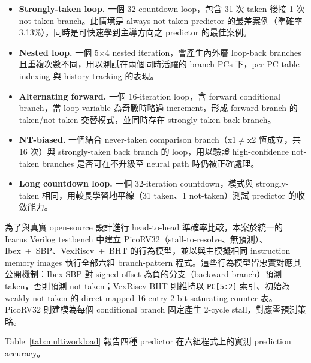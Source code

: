 \documentclass[12pt,a4paper]{article}
\begin{document}
	\begin{itemize}
		\item \textbf{Strongly-taken loop.} 一個 32-countdown loop，包含 31 次 taken 後接 1 次 not-taken branch。此情境是 always-not-taken predictor 的最差案例（準確率 3.13\%），同時是可快速學到主導方向之 predictor 的最佳案例。
		\item \textbf{Nested loop.} 一個 5$\times$4 nested iteration，會產生內外層 loop-back branches 且重複次數不同，用以測試在兩個同時活躍的 branch PCs 下，per-PC table indexing 與 history tracking 的表現。
		\item \textbf{Alternating forward.} 一個 16-iteration loop，含 forward conditional branch，當 loop variable 為奇數時略過 increment，形成 forward branch 的 taken/not-taken 交替模式，並同時存在 strongly-taken back branch。
		\item \textbf{NT-biased.} 一個結合 never-taken comparison branch（x1$\neq$x2 恆成立，共 16 次）與 strongly-taken back branch 的 loop，用以驗證 high-confidence not-taken branches 是否可在不升級至 neural path 時仍被正確處理。
		\item \textbf{Long countdown loop.} 一個 32-iteration countdown，模式與 strongly-taken 相同，用較長學習地平線（31 taken、1 not-taken）測試 predictor 的收斂能力。
	\end{itemize}

	為了與真實 open-source 設計進行 head-to-head 準確率比較，本案於統一的 Icarus Verilog testbench 中建立 PicoRV32（stall-to-resolve、無預測）、Ibex~+~SBP、VexRiscv~+~BHT 的行為模型，並以與主模擬相同 instruction memory images 執行全部六組 branch-pattern 程式。這些行為模型皆忠實對應其公開機制：Ibex SBP 對 signed offset 為負的分支（backward branch）預測 taken，否則預測 not-taken；VexRiscv BHT 則維持以 \texttt{PC[5:2]} 索引、初始為 weakly-not-taken 的 direct-mapped 16-entry 2-bit saturating counter 表。PicoRV32 則建模為每個 conditional branch 固定產生 2-cycle stall，對應零預測策略。

	Table~\ref{tab:multiworkload} 報告四種 predictor 在六組程式上的實測 prediction accuracy。
\end{document}
